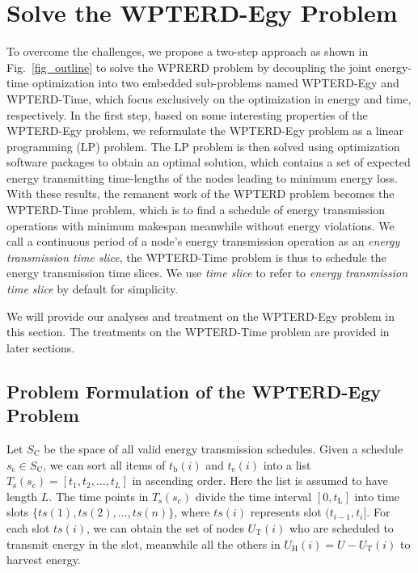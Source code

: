 \documentclass[12pt,journal,onecolumn,draftcls]{IEEEtran}
\begin{document}
\section{Solve the WPTERD-Egy Problem}
\label{sec_wpter_egy}
To overcome the challenges, we propose a two-step approach as shown in Fig.~\ref{fig_outline} to solve the WPRERD problem by decoupling the joint energy-time optimization into two embedded sub-problems named WPTERD-Egy and WPTERD-Time, which focus exclusively on the optimization in energy and time, respectively. In the first step, based on some interesting properties of the WPTERD-Egy problem, we reformulate the WPTERD-Egy problem as a linear programming (LP) problem. The LP problem is then solved using optimization software packages to obtain an optimal solution, which contains a set of expected energy transmitting time-lengths of the nodes leading to minimum energy loss. With these results, the remanent work of the WPTERD problem becomes the WPTERD-Time problem, which is to find a schedule of energy transmission operations with minimum makespan meanwhile without energy violations. We call a continuous period of a node's energy transmission operation as an \textit{energy transmission time slice}, the WPTERD-Time problem is thus to schedule the energy transmission time slices. We use \textit{time slice} to refer to \textit{energy transmission time slice} by default for simplicity.

We will provide our analyses and treatment on the WPTERD-Egy problem in this section. The treatments on the WPTERD-Time problem are provided in later sections.

\subsection{Problem Formulation of the WPTERD-Egy Problem}

Let $S_\text{C}$ be the space of all valid energy transmission schedules. Given a schedule $s_\text{c}{\in}S_\text{C}$, we can sort all items of $t_\text{b}(i)$ and $t_\text{e}(i)$ into a list $T_\text{s}(s_\text{c}){=}[t_1,t_2,\ldots,t_{L}]$ in ascending order. Here the list is assumed to have length $L$. The time points in $T_\text{s}(s_\text{c})$ divide the time interval $[0,t_\text{L}]$ into time slots $\{ts(1),ts(2),\ldots,ts(n)\}$, where $ts(i)$ represents slot $(t_{i{-}1},t_i]$. For each slot $ts(i)$, we can obtain the set of nodes $U_\text{T}(i)$ who are scheduled to transmit energy in the slot, meanwhile all the others in $U_\text{H}(i){=}U{-}U_\text{T}(i)$ to harvest energy.
\end{document}

